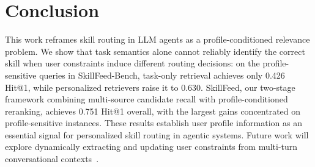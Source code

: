\documentclass[letterpaper]{article} %
\begin{document}

\section{Conclusion}

This work reframes skill routing in LLM agents as a profile-conditioned relevance problem. We show that task semantics alone cannot reliably identify
the correct skill when user constraints induce different routing decisions: on the profile-sensitive queries in SkillFeed-Bench, task-only retrieval achieves only 0.426  Hit@1, while personalized retrievers raise it to 0.630. SkillFeed, our two-stage framework combining multi-source candidate recall with profile-conditioned reranking, achieves 0.751 Hit@1 overall, with the largest gains concentrated on profile-sensitive instances. These results establish user profile information as an essential signal for personalized skill routing in agentic systems. 
Future work will explore dynamically extracting and updating user constraints from multi-turn conversational contexts~\cite{liu2026diagnostic}.



\end{document}

